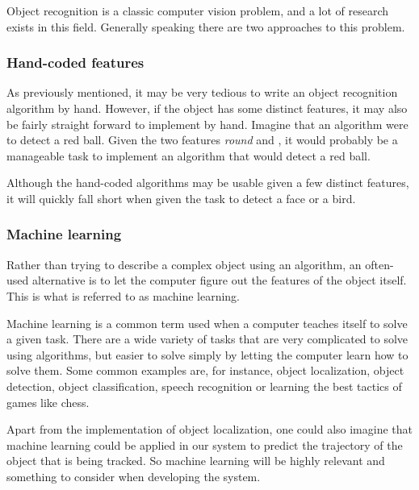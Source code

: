 Object recognition is a classic computer vision problem, and a lot of research exists in this field.
Generally speaking there are two approaches to this problem.

\subsubsection{Hand-coded features}
As previously mentioned, it may be very tedious to write an object recognition algorithm by hand.
However, if the object has some distinct features, it may also be fairly straight forward to implement by hand.
Imagine that an algorithm were to detect a red ball. 
Given the two features \textit{round} and , it would probably be a manageable task to implement an algorithm that would detect a red ball.

Although the hand-coded algorithms may be usable given a few distinct features, it will quickly fall short when given the task to detect a face or a bird.

\subsubsection{Machine learning}\label{sec:obj_tracking:sub:ML}
Rather than trying to describe a complex object using an algorithm, an often-used alternative is to let the computer figure out the features of the object itself.
This is what is referred to as machine learning.

Machine learning is a common term used when a computer teaches itself to solve a given task\cite{MachineLearningWiki}.
There are a wide variety of tasks that are very complicated to solve using algorithms, but easier to solve simply by letting the computer learn how to solve them. 
Some common examples are, for instance, object localization, object detection, object classification, speech recognition or learning the best tactics of games like chess.

Apart from the implementation of object localization, one could also imagine that machine learning could be applied in our system to predict the trajectory of the object that is being tracked.
So machine learning will be highly relevant and something to consider when developing the system.
